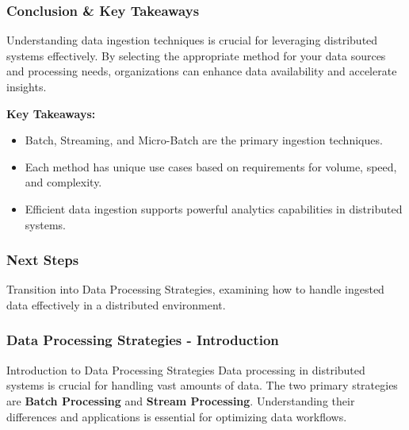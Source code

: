 \documentclass[aspectratio=169]{beamer}
\begin{document}
\begin{frame}[fragile]
  \frametitle{Conclusion & Key Takeaways}
  Understanding data ingestion techniques is crucial for leveraging distributed systems effectively. 
  By selecting the appropriate method for your data sources and processing needs, organizations can enhance data availability and accelerate insights.
  
  \textbf{Key Takeaways:}
  \begin{itemize}
    \item Batch, Streaming, and Micro-Batch are the primary ingestion techniques.
    \item Each method has unique use cases based on requirements for volume, speed, and complexity.
    \item Efficient data ingestion supports powerful analytics capabilities in distributed systems.
  \end{itemize}
\end{frame}

\begin{frame}[fragile]
  \frametitle{Next Steps}
  Transition into Data Processing Strategies, examining how to handle ingested data effectively in a distributed environment.
\end{frame}

\begin{frame}[fragile]
  \frametitle{Data Processing Strategies - Introduction}
  \begin{block}{Introduction to Data Processing Strategies}
    Data processing in distributed systems is crucial for handling vast amounts of data. 
    The two primary strategies are \textbf{Batch Processing} and \textbf{Stream Processing}. 
    Understanding their differences and applications is essential for optimizing data workflows.
  \end{block}
\end{frame}
\end{document}
